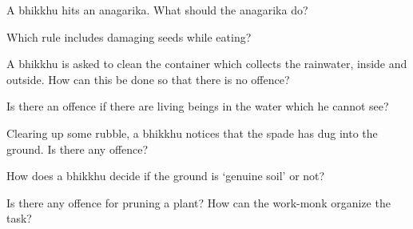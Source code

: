 A bhikkhu hits an anagarika. What should the anagarika do?

\bigskip

Which rule includes damaging seeds while eating?

\bigskip

A bhikkhu is asked to clean the container which collects the rainwater, inside and outside.
How can this be done so that there is no offence?

\bigskip

Is there an offence if there are living beings in the water which he cannot see?

\bigskip

Clearing up some rubble, a bhikkhu notices that the spade has dug into the ground. Is there any offence?

\bigskip

How does a bhikkhu decide if the ground is `genuine soil' or not?

\bigskip

Is there any offence for pruning a plant? How can the work-monk organize the task?

